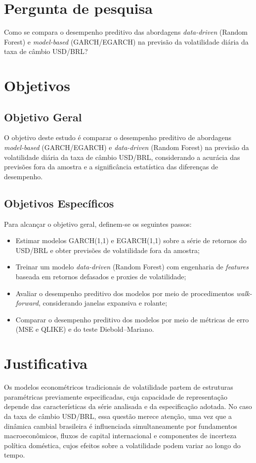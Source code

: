 \section{Pergunta de pesquisa}
Como se compara o desempenho preditivo das abordagens \textit{data-driven} (Random Forest) e \textit{model-based} (GARCH/EGARCH) na previsão da volatilidade diária da taxa de câmbio USD/BRL?

\section{Objetivos}

\subsection{Objetivo Geral}
O objetivo deste estudo é comparar o desempenho preditivo de abordagens \textit{model-based} (GARCH/EGARCH) e \textit{data-driven} (Random Forest) na previsão da volatilidade diária da taxa de câmbio USD/BRL, considerando a acurácia das previsões fora da amostra e a significância estatística das diferenças de desempenho.

\subsection{Objetivos Específicos}
Para alcançar o objetivo geral, definem-se os seguintes passos:
\begin{itemize}
    \item Estimar modelos GARCH(1,1) e EGARCH(1,1) sobre a série de retornos do USD\slash BRL e obter previsões de volatilidade fora da amostra;
    \item Treinar um modelo \textit{data-driven} (Random Forest) com engenharia de \textit{features} baseada em retornos defasados e proxies de volatilidade;
    \item Avaliar o desempenho preditivo dos modelos por meio de procedimentos \textit{walk-forward}, considerando janelas expansiva e rolante;
    \item Comparar o desempenho preditivo dos modelos por meio de métricas de erro (MSE e QLIKE) e do teste Diebold–Mariano.
\end{itemize}

\section{Justificativa}

Os modelos econométricos tradicionais de volatilidade partem de estruturas paramétricas previamente especificadas, cuja capacidade de representação depende das características 
da série analisada e da especificação adotada. No caso da taxa de câmbio USD/BRL, essa questão merece atenção, uma vez que a dinâmica cambial brasileira é influenciada simultaneamente 
por fundamentos macroeconômicos, fluxos de capital internacional e componentes de incerteza política doméstica, cujos efeitos sobre a volatilidade podem variar ao longo do tempo.

